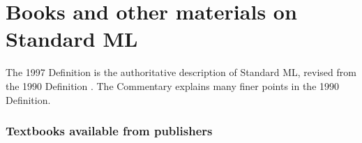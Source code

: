 \documentclass[fleqn,a4paper]{article}
\begin{document}


\newpage
\section{Books and other materials on Standard ML}
\label{sec-books}


The 1997 Definition \cite{Milner:1997:TheDefinition} is the
authoritative description of Standard ML, revised from the 1990
Definition \cite{Milner:1990:TheDefinition}\@.  The Commentary
\cite{Milner:1991:Commentary} explains many finer points in the 1990
Definition.


\subsubsection*{Textbooks available from publishers}
\end{document}
